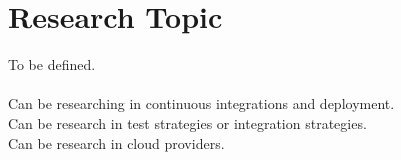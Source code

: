 \section{Research Topic}
\label{sec:research}

To be defined. \\ \\
Can be researching in continuous integrations and deployment. \\
Can be research in test strategies or integration strategies. \\
Can be research in cloud providers.